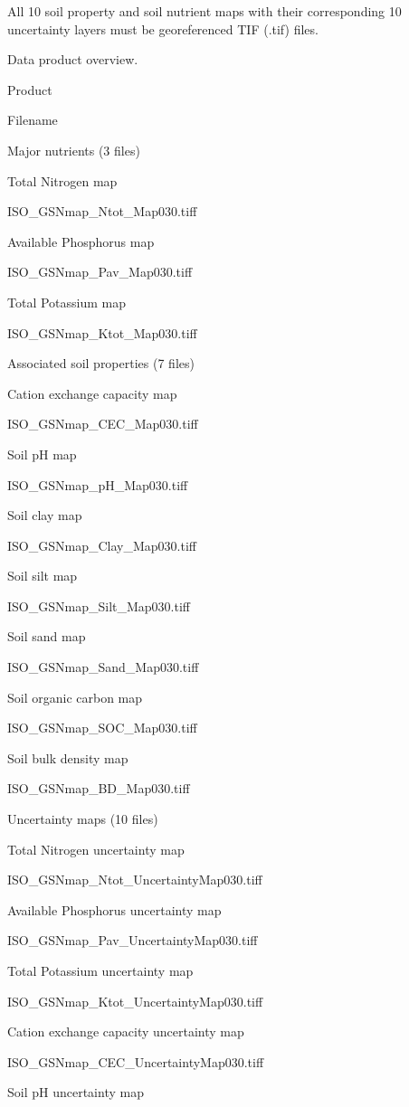 \documentclass[
  10pt,
  b5paper,
  oneside]{book}
\begin{document}
All 10 soil property and soil nutrient maps with their corresponding 10 uncertainty layers must be georeferenced TIF (.tif) files.

\label{tab:products}\label{tab:products}Data product overview.

Product

Filename

Major nutrients (3 files)

Total Nitrogen map

ISO\_GSNmap\_Ntot\_Map030.tiff

Available Phosphorus map

ISO\_GSNmap\_Pav\_Map030.tiff

Total Potassium map

ISO\_GSNmap\_Ktot\_Map030.tiff

Associated soil properties (7 files)

Cation exchange capacity map

ISO\_GSNmap\_CEC\_Map030.tiff

Soil pH map

ISO\_GSNmap\_pH\_Map030.tiff

Soil clay map

ISO\_GSNmap\_Clay\_Map030.tiff

Soil silt map

ISO\_GSNmap\_Silt\_Map030.tiff

Soil sand map

ISO\_GSNmap\_Sand\_Map030.tiff

Soil organic carbon map

ISO\_GSNmap\_SOC\_Map030.tiff

Soil bulk density map

ISO\_GSNmap\_BD\_Map030.tiff

Uncertainty maps (10 files)

Total Nitrogen uncertainty map

ISO\_GSNmap\_Ntot\_UncertaintyMap030.tiff

Available Phosphorus uncertainty map

ISO\_GSNmap\_Pav\_UncertaintyMap030.tiff

Total Potassium uncertainty map

ISO\_GSNmap\_Ktot\_UncertaintyMap030.tiff

Cation exchange capacity uncertainty map

ISO\_GSNmap\_CEC\_UncertaintyMap030.tiff

Soil pH uncertainty map
\end{document}

